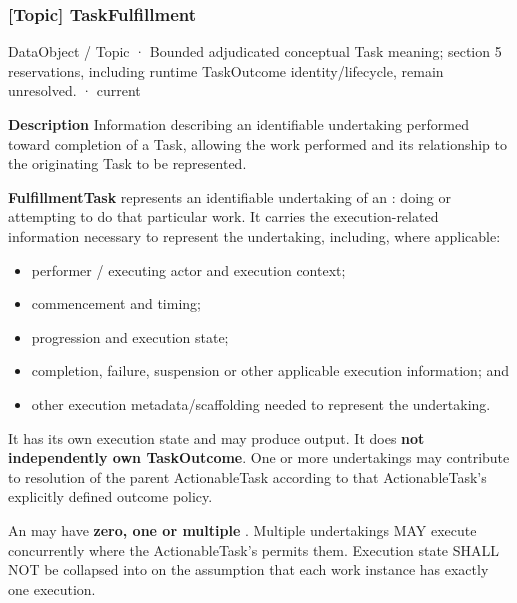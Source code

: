 \subsubsection{[Topic] TaskFulfillment}

\label{element:30f4deffcd694f07bf54b2b192695d4f}
{\small DataObject / Topic · Bounded adjudicated conceptual Task meaning; section 5 reservations, including runtime TaskOutcome identity/lifecycle, remain unresolved. · current}\par

\textbf{Description}
Information describing an identifiable undertaking performed toward completion of a Task, allowing the work performed and its relationship to the originating Task to be represented.



\textbf{FulfillmentTask} represents an identifiable undertaking of an
\texttt{}: doing or attempting to do that particular work. It carries
the execution-related information necessary to represent the undertaking,
including, where applicable:



\begin{itemize}


\item performer / executing actor and execution context;

\item commencement and timing;

\item progression and execution state;

\item completion, failure, suspension or other applicable execution information;
  and

\item other execution metadata/scaffolding needed to represent the undertaking.

\end{itemize}


It has its own execution state and may produce output. It does \textbf{not
independently own TaskOutcome}. One or more undertakings may contribute to
resolution of the parent ActionableTask according to that ActionableTask's
explicitly defined outcome policy.



An \texttt{} may have \textbf{zero, one or multiple \texttt{}}.
Multiple undertakings MAY execute concurrently where the ActionableTask's
\texttt{} permits them. Execution state SHALL NOT be collapsed into
\texttt{} on the assumption that each work instance has exactly one
execution.




